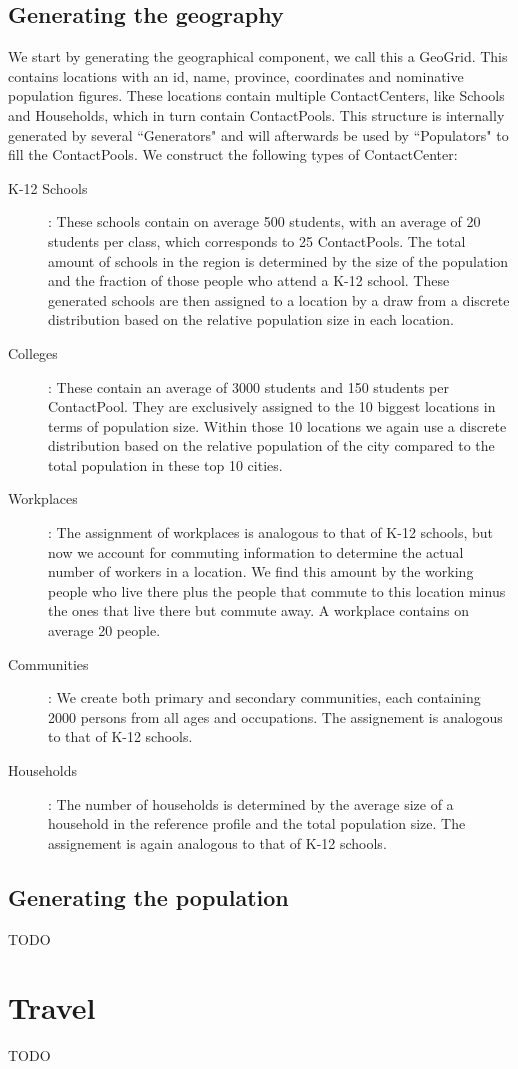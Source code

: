 \subsection{Generating the geography}
\label{subsection:gengeo}
We start by generating the geographical component, we call this a GeoGrid.
This contains locations with an id, name, province, coordinates and nominative population figures.
These locations contain multiple ContactCenters, like Schools and Households, which in turn contain ContactPools.
This structure is internally generated by several ``Generators" and will afterwards be used by ``Populators" to fill the ContactPools.
We construct the following types of ContactCenter:

\begin{description}
    \item[K-12 Schools]:
        These schools contain on average 500 students, with an average of 20 students per class, which corresponds to 25 ContactPools.
        The total amount of schools in the region is determined by the size of the population and the fraction of those people who attend a K-12 school.
        These generated schools are then assigned to a location by a draw from a discrete distribution based on the relative population size in each location.
    \item[Colleges]:
        These contain an average of 3000 students and 150 students per ContactPool.
        They are exclusively assigned to the 10 biggest locations in terms of population size.
        Within those 10 locations we again use a discrete distribution based on the relative population of the city compared to the total population in these top 10 cities.
    \item[Workplaces]:
        The assignment of workplaces is analogous to that of K-12 schools, but now we account for commuting information to determine the actual number of workers in a location.
        We find this amount by the working people who live there plus the people that commute to this location minus the ones that live there but commute away.
        A workplace contains on average 20 people.
    \item[Communities]:
        We create both primary and secondary communities, each containing 2000 persons from all ages and occupations.
        The assignement is analogous to that of K-12 schools.
    \item[Households]:
        The number of households is determined by the average size of a household in the reference profile and the total population size.
        The assignement is again analogous to that of K-12 schools.
\end{description}

\subsection{Generating the population}
\label{subsection:genpop}
TODO


\section{Travel}
\label{section:travel}
TODO
